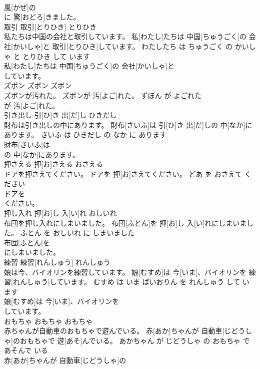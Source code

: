 \documentclass[8pt]{extreport}
\begin{document}
\begin{CJK}{UTF8}{min}
\\	風[かぜ]の
\\	に 驚[おどろ]きました。			
\\	取引	取引[とりひき]	とりひき	
\\	私たちは中国の会社と取引しています。	私[わたし]たちは 中国[ちゅうごく]の 会社[かいしゃ]と 取引[とりひき]しています。	わたしたち は ちゅうごく の かいしゃ と とりひき して います	
\\	私[わたし]たちは 中国[ちゅうごく]の 会社[かいしゃ]と
\\	しています。			
\\	ズボン	ズボン	ズボン	
\\	ズボンが汚れた。	ズボンが 汚[よご]れた。	ずぼん が よごれた	
\\	が 汚[よご]れた。			
\\	引き出し	引[ひ]き 出[だ]し	ひきだし	
\\	財布は引き出しの中にあります。	財布[さいふ]は 引[ひ]き 出[だ]しの 中[なか]にあります。	さいふ は ひきだし の なか に あります	
\\	財布[さいふ]は
\\	の 中[なか]にあります。			
\\	押さえる	押[お]さえる	おさえる	
\\	ドアを押さえてください。	ドアを 押[お]さえてください。	どあ を おさえて ください	
\\	ドアを
\\	ください。			
\\	押し入れ	押[お]し 入[い]れ	おしいれ	
\\	布団を押し入れにしまいました。	布団[ふとん]を 押[お]し 入[い]れにしまいました。	ふとん を おしいれ に しまいました	
\\	布団[ふとん]を
\\	にしまいました。			
\\	練習	練習[れんしゅう]	れんしゅう	
\\	娘は今、バイオリンを練習しています。	娘[むすめ]は 今[いま]、バイオリンを 練習[れんしゅう]しています。	むすめ は いま ばいおりん を れんしゅう して います	
\\	娘[むすめ]は 今[いま]、バイオリンを
\\	しています。			
\\	おもちゃ	おもちゃ	おもちゃ	
\\	赤ちゃんが自動車のおもちゃで遊んでいる。	赤[あか]ちゃんが 自動車[じどうしゃ]のおもちゃで 遊[あそ]んでいる。	あかちゃん が じどうしゃ の おもちゃ で あそんで いる	
\\	赤[あか]ちゃんが 自動車[じどうしゃ]の

\end{CJK}
\end{document}
